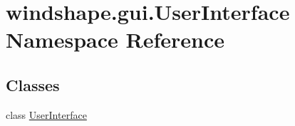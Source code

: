\hypertarget{namespacewindshape_1_1gui_1_1_user_interface}{}\section{windshape.\+gui.\+User\+Interface Namespace Reference}
\label{namespacewindshape_1_1gui_1_1_user_interface}
\subsection*{Classes}
\begin{DoxyCompactItemize}
\item 
class \mbox{\hyperlink{classwindshape_1_1gui_1_1_user_interface_1_1_user_interface}{User\+Interface}}
\end{DoxyCompactItemize}
